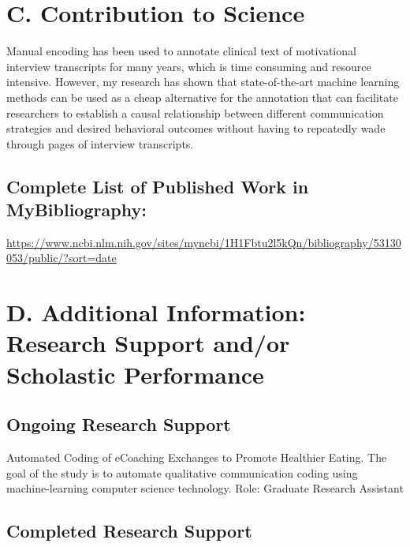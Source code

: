 \documentclass{nihbiosketch}
\begin{document}

\section{C. Contribution to Science}

\begin{enumerate}

Manual encoding has been used to annotate clinical text of motivational interview transcripts for many years, which is time consuming and resource intensive. However, my research has shown that state-of-the-art machine learning methods can be used as a cheap alternative for the annotation that can facilitate researchers to establish a causal relationship between different communication strategies and desired behavioral outcomes without having to repeatedly wade through pages of interview transcripts.

\end{enumerate}

\subsection*{Complete List of Published Work in MyBibliography:} 
\url{https://www.ncbi.nlm.nih.gov/sites/myncbi/1H1Fbtu2l5kQn/bibliography/53130053/public/?sort=date}


\section{D. Additional Information: Research Support and/or Scholastic Performance}

\subsection*{Ongoing Research Support}

{Automated Coding of eCoaching Exchanges to Promote Healthier Eating.}
{The goal of the study is to automate qualitative communication coding using machine-learning computer science technology.}
{Role: Graduate Research Assistant}


\subsection*{Completed Research Support}
\end{document}

